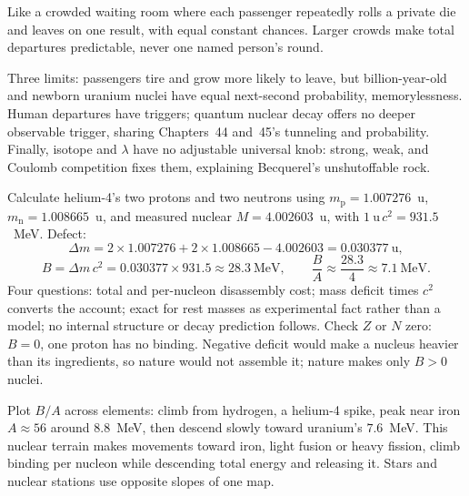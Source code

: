 Like a crowded waiting room where each passenger repeatedly rolls a private die and leaves on one result, with equal constant chances. Larger crowds make total departures predictable, never one named person's round.

Three limits: passengers tire and grow more likely to leave, but billion-year-old and newborn uranium nuclei have equal next-second probability, memorylessness. Human departures have triggers; quantum nuclear decay offers no deeper observable trigger, sharing Chapters~44 and~45's tunneling and probability. Finally, isotope and \(\lambda\) have no adjustable universal knob: strong, weak, and Coulomb competition fixes them, explaining Becquerel's unshutoffable rock.


Calculate helium-4's two protons and two neutrons using \(m_{\mathrm p}=1.007276\)~u, \(m_{\mathrm n}=1.008665\)~u, and measured nuclear \(M=4.002603\)~u, with \(1~\mathrm{u}\,c^{2}=931.5\)~MeV. Defect:
\[
\Delta m=2\times1.007276+2\times1.008665-4.002603=0.030377~\mathrm{u},
\]
\[
B=\Delta m\,c^{2}=0.030377\times931.5\approx28.3~\mathrm{MeV},
\qquad \frac{B}{A}\approx\frac{28.3}{4}\approx7.1~\mathrm{MeV}.
\]
Four questions: total and per-nucleon disassembly cost; mass deficit times \(c^2\) converts the account; exact for rest masses as experimental fact rather than a model; no internal structure or decay prediction follows. Check \(Z\) or \(N\) zero: \(B=0\), one proton has no binding. Negative deficit would make a nucleus heavier than its ingredients, so nature would not assemble it; nature makes only \(B>0\) nuclei.

Plot \(B/A\) across elements: climb from hydrogen, a helium-4 spike, peak near iron \(A\approx56\) around \(8.8\)~MeV, then descend slowly toward uranium's \(7.6\)~MeV. This nuclear terrain makes movements toward iron, light fusion or heavy fission, climb binding per nucleon while descending total energy and releasing it. Stars and nuclear stations use opposite slopes of one map.

